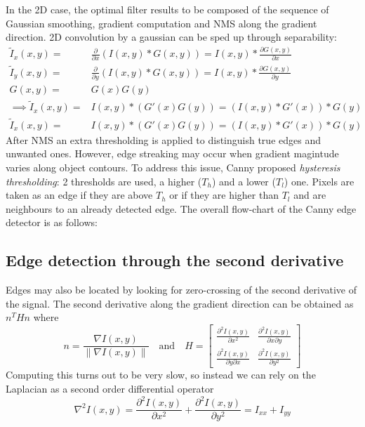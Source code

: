 \documentclass{article}
\begin{document}
In the 2D case, the optimal filter results to be composed of the sequence of Gaussian smoothing, gradient computation and NMS along the gradient direction. 
2D convolution by a gaussian can be sped up through separability:
\begin{align*}
    \tilde{I}_x(x,y) =& \frac{\partial}{\partial x} (I(x,y)\ast G(x,y)) = I(x,y) \ast \frac{\partial G(x,y)}{\partial x}\\
    \tilde{I}_y(x,y) =& \frac{\partial}{\partial y} (I(x,y)\ast G(x,y)) = I(x,y) \ast \frac{\partial G(x,y)}{\partial y}\\
    G(x,y) =& G(x)G(y)\\
    \implies \tilde{I}_x(x,y) =& I(x,y) \ast (G'(x)G(y))  =(I(x,y)\ast G'(x))\ast G(y)\\
    \tilde{I}_x(x,y) =& I(x,y) \ast (G'(x)G(y))=(I(x,y)\ast G'(x))\ast G(y)
\end{align*}
After NMS an extra thresholding is applied to distinguish true edges and unwanted ones. However, edge streaking may occur when gradient magintude varies along object contours. To address this issue, Canny proposed \emph{hysteresis thresholding}: 2 thresholds are used, a higher ($T_h$) and a lower ($T_l$) one. Pixels are taken as an edge if they are above $T_h$ or if they are higher than $T_l$ and are neighbours to an already detected edge. The overall flow-chart of the Canny edge detector is as follows:
\subsection{Edge detection through the second derivative}
Edges may also be located by looking for zero-crossing of the second derivative of the signal. The second derivative along the gradient direction can be obtained as $n^THn$ where 
\[
    n = \frac{\nabla I(x,y)}{\|\nabla I(x,y)\|} \quad \text{and} \quad H = \begin{bmatrix}
        \frac{\partial^2I(x,y)}{\partial x^2} & \frac{\partial^2I(x,y)}{\partial x \partial y}\\
        \frac{\partial^2I(x,y)}{\partial y \partial x} & \frac{\partial^2I(x,y)}{\partial y^2}
    \end{bmatrix}
\]
Computing this turns out to be very slow, so instead we can rely on the Laplacian as a second order differential operator 
\[
    \nabla^2 I(x,y) = \frac{\partial^2I(x,y)}{\partial x^2}+\frac{\partial^2I(x,y)}{\partial y^2} = I_{xx}+I_{yy}
\]
\end{document}
